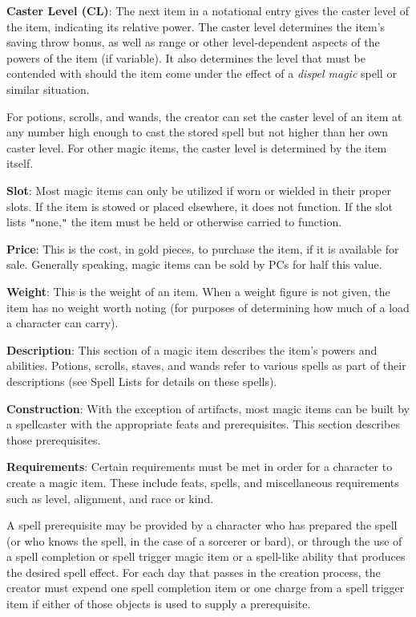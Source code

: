 \textbf{Caster Level (CL)}: The next item in a notational entry gives the caster level of the item, indicating its relative power. The caster level determines the item's saving throw bonus, as well as range or other level-dependent aspects of the powers of the item (if variable). It also determines the level that must be contended with should the item come under the effect of a \textit{dispel magic }spell or similar situation.
				
For potions, scrolls, and wands, the creator can set the caster level of an item at any number high enough to cast the stored spell but not higher than her own caster level. For other magic items, the caster level is determined by the item itself. 
				
\textbf{Slot}: Most magic items can only be utilized if worn or wielded in their proper slots. If the item is stowed or placed elsewhere, it does not function. If the slot lists \texttt{{}"{}}none,\texttt{{}"{}} the item must be held or otherwise carried to function.
				
\textbf{Price}: This is the cost, in gold pieces, to purchase the item, if it is available for sale. Generally speaking, magic items can be sold by PCs for half this value. 
				
\textbf{Weight}: This is the weight of an item. When a weight figure is not given, the item has no weight worth noting (for purposes of determining how much of a load a character can carry).
				
\textbf{Description}: This section of a magic item describes the item's powers and abilities. Potions, scrolls, staves, and wands refer to various spells as part of their descriptions (see Spell Lists for details on these spells).
				
\textbf{Construction}: With the exception of artifacts, most magic items can be built by a spellcaster with the appropriate feats and prerequisites. This section describes those prerequisites. 
				
\textbf{Requirements}: Certain requirements must be met in order for a character to create a magic item. These include feats, spells, and miscellaneous requirements such as level, alignment, and race or kind.
				
A spell prerequisite may be provided by a character who has prepared the spell (or who knows the spell, in the case of a sorcerer or bard), or through the use of a spell completion or spell trigger magic item or a spell-like ability that produces the desired spell effect. For each day that passes in the creation process, the creator must expend one spell completion item or one charge from a spell trigger item if either of those objects is used to supply a prerequisite.
				
